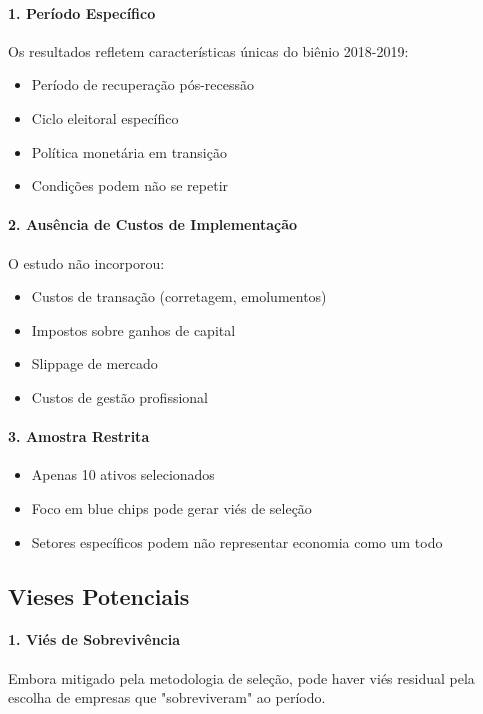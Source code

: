 \paragraph{1. Período Específico}
Os resultados refletem características únicas do biênio 2018-2019:
\begin{itemize}
    \item Período de recuperação pós-recessão
    \item Ciclo eleitoral específico
    \item Política monetária em transição
    \item Condições podem não se repetir
\end{itemize}

\paragraph{2. Ausência de Custos de Implementação}
O estudo não incorporou:
\begin{itemize}
    \item Custos de transação (corretagem, emolumentos)
    \item Impostos sobre ganhos de capital
    \item Slippage de mercado
    \item Custos de gestão profissional
\end{itemize}

\paragraph{3. Amostra Restrita}
\begin{itemize}
    \item Apenas 10 ativos selecionados
    \item Foco em blue chips pode gerar viés de seleção
    \item Setores específicos podem não representar economia como um todo
\end{itemize}

\subsection{Vieses Potenciais}

\paragraph{1. Viés de Sobrevivência}
Embora mitigado pela metodologia de seleção, pode haver viés residual pela escolha de empresas que "sobreviveram" ao período.

